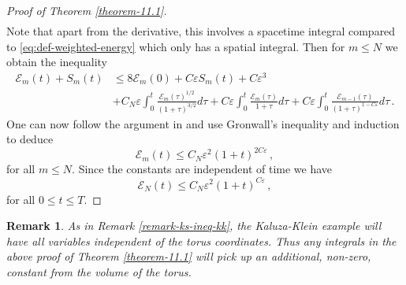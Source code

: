 \documentclass[11pt, a4paper]{amsart}
\numberwithin{equation}{section}
\newtheorem{remark}[theorem]{Remark}
\numberwithin{theorem}{section}
\begin{document}
\begin{proof}[Proof of Theorem \ref{theorem-11.1}]
\begin{align*}
\end{align*}
Note that apart from the derivative, this involves a spacetime integral compared to \eqref{eq:def-weighted-energy} which only has a spatial integral. Then for $m \leq N$ we obtain the inequality
\begin{align*}
\mathcal{E}_m(t) + S_m(t) & \leq 8 \mathcal{E}_m(0) + C \varepsilon S_m(t) + C \varepsilon^3 \\
 & +C_N \varepsilon \int_0^t\frac{\mathcal{E}_m(\tau)^{1/2}}{(1+\tau)^{3/2}} d \tau + C \varepsilon \int_0^t \frac{\mathcal{E}_m(\tau)}{1+\tau} d \tau + C \varepsilon \int_0^t \frac{\mathcal{E}_{m-1} (\tau)}{(1+\tau)^{1-C\varepsilon}}  d \tau \,.
\end{align*}
One can now follow the argument in \cite{LR:04} and use Gronwall's inequality and induction to deduce
$$ \mathcal{E}_m (t) \leq C_N \varepsilon^2 (1+t)^{2C \varepsilon} \,,$$
for all $m \leq N$. Since the constants are independent of time we have
$$ \mathcal{E}_N (t) \leq C_N \varepsilon^2 (1+t)^{C\varepsilon} \,, $$
for all $0 \leq t \leq T$. 
\end{proof}

\begin{remark}  
As in Remark \ref{remark-ks-ineq-kk}, the Kaluza-Klein example will have all variables independent of the torus coordinates. Thus any integrals in the above proof of Theorem \ref{theorem-11.1} will pick up an additional, non-zero, constant from the volume of the torus. 
\end{remark}
\end{document}
